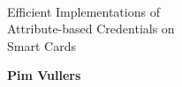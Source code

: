 \thispagestyle{empty}

~\\

\vspace{2cm}

\begin{center}
\sffamily{}\selectfont\Huge
Efficient Implementations of\\
Attribute-based Credentials on\\
Smart Cards
\end{center}

\vspace{3cm}

\begin{center}
\textsf{\textbf{\Large Pim Vullers}}
\end{center}

